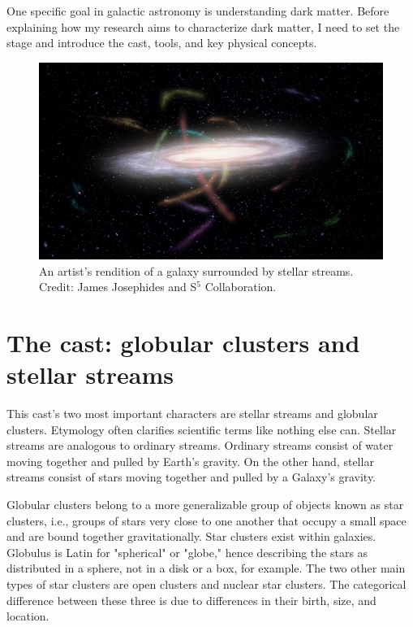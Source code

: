 One specific goal in galactic astronomy is understanding dark matter. Before explaining how my research aims to characterize dark matter, I need to set the stage and introduce the cast, tools, and key physical concepts. 


\begin{figure}
    \centering
    \includegraphics[width=\linewidth]{images/S5MilkywayStreams.jpg}
    \caption{An artist's rendition of a galaxy surrounded by stellar streams. Credit: James Josephides and S$^5$ Collaboration.}
    \label{fig:images/Hubble_Tuning_Fork_diagram}
\end{figure}


\section{The cast: globular clusters and stellar streams}

This cast's two most important characters are stellar streams and globular clusters. Etymology often clarifies scientific terms like nothing else can. Stellar streams are analogous to ordinary streams. Ordinary streams consist of water moving together and pulled by Earth's gravity. On the other hand, stellar streams consist of stars moving together and pulled by a Galaxy's gravity.

Globular clusters belong to a more generalizable group of objects known as star clusters, i.e., groups of stars very close to one another that occupy a small space and are bound together gravitationally. Star clusters exist within galaxies. Globulus is Latin for "spherical" or "globe," hence describing the stars as distributed in a sphere, not in a disk or a box, for example. The two other main types of star clusters are open clusters and nuclear star clusters. The categorical difference between these three is due to differences in their birth, size, and 
location. 

